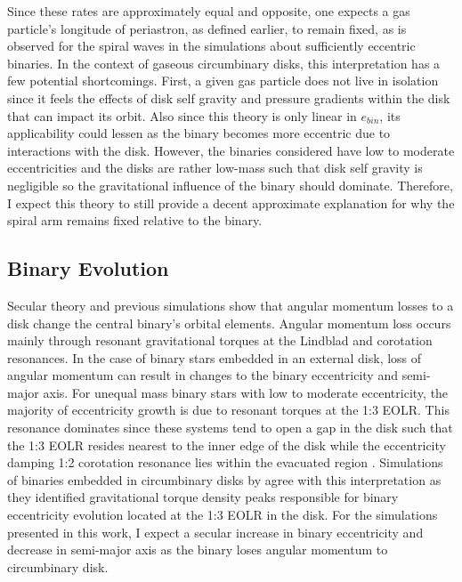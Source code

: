 Since these rates are approximately equal and opposite, one expects a
gas particle's longitude of periastron, as defined earlier, to remain
fixed, as is observed for the spiral waves in the simulations about
sufficiently eccentric binaries.  In the context of gaseous circumbinary
disks, this interpretation has a few potential shortcomings.  First, a
given gas particle does not live in isolation since it feels the
effects of disk self gravity and pressure gradients within the disk that can impact its orbit.  Also since this theory is only linear in $e_{bin}$, its applicability could 
lessen as the binary becomes more eccentric due to interactions with the disk.  However, the binaries considered have low to moderate eccentricities and the 
disks are rather low-mass such that disk self gravity is negligible so the gravitational influence of the binary should dominate.  Therefore, I expect this 
theory to still provide a decent approximate explanation for why the spiral arm remains fixed relative to the binary.  
	

\subsection{Binary Evolution} \label{CBDisk:sec:BinaryEvolution}

Secular theory \citep{Goldreich1979,Goldreich1980,Pringle1991,Papaloizou2001} and previous simulations \citep{Artymowicz1991,Cuadra2009,Roedig2012,Dermine2013} show that angular 
momentum losses to a disk change the central binary's orbital elements.  Angular momentum loss occurs mainly through resonant gravitational torques 
at the Lindblad and corotation resonances.  In the case of binary stars embedded in an external disk, loss of angular momentum can result in changes to the 
binary eccentricity and semi-major axis.  For unequal mass binary stars with low to moderate eccentricity, the majority of eccentricity growth is due to resonant 
torques at the 1:3 EOLR.  This resonance dominates since these systems tend to open a gap in the disk such that the 1:3 EOLR resides nearest to the inner 
edge of the disk while the eccentricity damping 1:2 corotation resonance lies within the evacuated region \citep{Artymowicz1991,Artymowicz1992}.  Simulations of
binaries embedded in circumbinary disks by \citet{Roedig2012} agree with this interpretation as they identified gravitational torque density peaks responsible for 
binary eccentricity evolution located at the 1:3 EOLR in the disk.  For the simulations presented in this work, I expect a secular increase in binary eccentricity 
and decrease in semi-major axis as the binary loses angular momentum to circumbinary disk.


